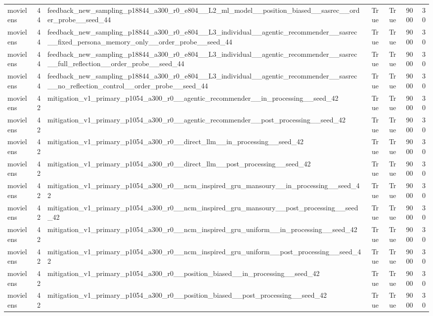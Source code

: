 \begin{table}[htbp!]
\begin{tabular}{lrlrrrr}
movielens & 44 & feedback\_new\_sampling\_p18844\_a300\_r0\_e804\_\_L2\_ml\_model\_\_position\_biased\_\_sasrec\_\_order\_probe\_\_seed\_44 & True & True & 9000 & 30 \\
movielens & 44 & feedback\_new\_sampling\_p18844\_a300\_r0\_e804\_\_L3\_individual\_\_agentic\_recommender\_\_sasrec\_\_fixed\_persona\_memory\_only\_\_order\_probe\_\_seed\_44 & True & True & 9000 & 30 \\
movielens & 44 & feedback\_new\_sampling\_p18844\_a300\_r0\_e804\_\_L3\_individual\_\_agentic\_recommender\_\_sasrec\_\_full\_reflection\_\_order\_probe\_\_seed\_44 & True & True & 9000 & 30 \\
movielens & 44 & feedback\_new\_sampling\_p18844\_a300\_r0\_e804\_\_L3\_individual\_\_agentic\_recommender\_\_sasrec\_\_no\_reflection\_control\_\_order\_probe\_\_seed\_44 & True & True & 9000 & 30 \\
movielens & 42 & mitigation\_v1\_primary\_p1054\_a300\_r0\_\_agentic\_recommender\_\_in\_processing\_\_seed\_42 & True & True & 9000 & 30 \\
movielens & 42 & mitigation\_v1\_primary\_p1054\_a300\_r0\_\_agentic\_recommender\_\_post\_processing\_\_seed\_42 & True & True & 9000 & 30 \\
movielens & 42 & mitigation\_v1\_primary\_p1054\_a300\_r0\_\_direct\_llm\_\_in\_processing\_\_seed\_42 & True & True & 9000 & 30 \\
movielens & 42 & mitigation\_v1\_primary\_p1054\_a300\_r0\_\_direct\_llm\_\_post\_processing\_\_seed\_42 & True & True & 9000 & 30 \\
movielens & 42 & mitigation\_v1\_primary\_p1054\_a300\_r0\_\_ncm\_inspired\_gru\_mansoury\_\_in\_processing\_\_seed\_42 & True & True & 9000 & 30 \\
movielens & 42 & mitigation\_v1\_primary\_p1054\_a300\_r0\_\_ncm\_inspired\_gru\_mansoury\_\_post\_processing\_\_seed\_42 & True & True & 9000 & 30 \\
movielens & 42 & mitigation\_v1\_primary\_p1054\_a300\_r0\_\_ncm\_inspired\_gru\_uniform\_\_in\_processing\_\_seed\_42 & True & True & 9000 & 30 \\
movielens & 42 & mitigation\_v1\_primary\_p1054\_a300\_r0\_\_ncm\_inspired\_gru\_uniform\_\_post\_processing\_\_seed\_42 & True & True & 9000 & 30 \\
movielens & 42 & mitigation\_v1\_primary\_p1054\_a300\_r0\_\_position\_biased\_\_in\_processing\_\_seed\_42 & True & True & 9000 & 30 \\
movielens & 42 & mitigation\_v1\_primary\_p1054\_a300\_r0\_\_position\_biased\_\_post\_processing\_\_seed\_42 & True & True & 9000 & 30 \\

\end{tabular}
\end{table}
